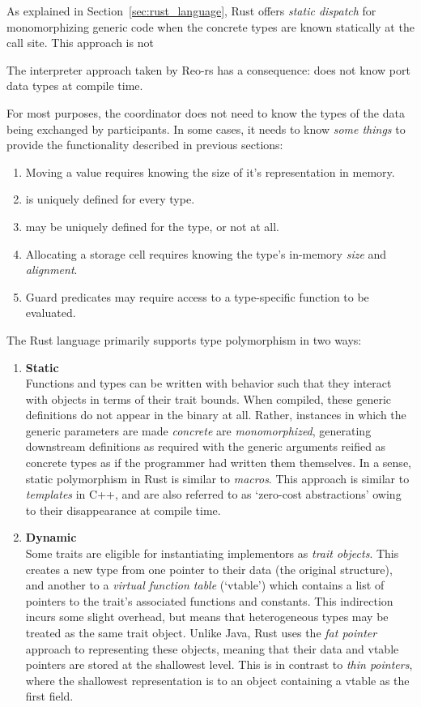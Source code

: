 As explained in Section~\ref{sec:rust_language}, Rust offers \textit{static dispatch} for monomorphizing generic code when the concrete types are known statically at the call site. This approach is not 

The interpreter approach taken by Reo-rs has a consequence:  does not know port data types at compile time. 

For most purposes, the coordinator does not need to know the types of the data being exchanged by participants. In some cases, it needs to know \textit{some things} to provide the functionality described in previous sections:
\begin{enumerate}
	\item Moving a value requires knowing the size of it's representation in memory.
	\item {} is uniquely defined for every type.
	\item {} may be uniquely defined for the type, or not at all.
	\item Allocating a storage cell requires knowing the type's in-memory \textit{size} and \textit{alignment}.
	\item Guard predicates may require access to a type-specific  function to be evaluated.
\end{enumerate}

The Rust language primarily supports type polymorphism in two ways:
\begin{enumerate}
	\item \textbf{Static}\\
	Functions and types can be written with behavior such that they interact with objects in terms of their trait bounds. When compiled, these generic definitions do not appear in the binary at all. Rather, instances in which the generic parameters are made \textit{concrete} are \textit{monomorphized}, generating downstream definitions as required with the generic arguments reified as concrete types as if the programmer had written them themselves. In a sense, static polymorphism in Rust is similar to \textit{macros}. This approach is similar to \textit{templates} in C++, and are also referred to as `zero-cost abstractions' owing to their disappearance at compile time.
	
	\item \textbf{Dynamic}\\
	Some traits are eligible for instantiating implementors as \textit{trait objects}. This creates a new type from one pointer to their data (the original structure), and another to a \textit{virtual function table} (`vtable') which contains a list of pointers to the trait's associated functions and constants. This indirection incurs some slight overhead, but means that heterogeneous types may be treated as the same trait object. Unlike Java, Rust uses the \textit{fat pointer} approach to representing these objects, meaning that their data and vtable pointers are stored at the shallowest level. This is in contrast to \textit{thin pointers}, where the shallowest representation is to an object containing a vtable as the first field.
	
\end{enumerate}


